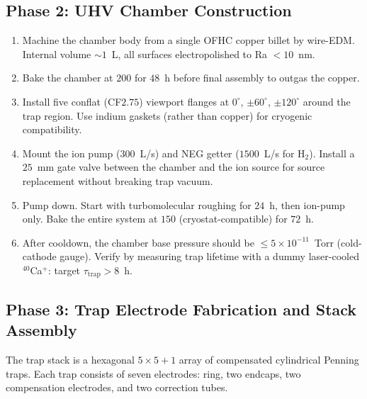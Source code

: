 \subsection{Phase 2: UHV Chamber Construction}
\label{subsec:phase2_uhv}

\begin{enumerate}[leftmargin=1.5em]
    \item Machine the chamber body from a single OFHC copper billet by wire-EDM. Internal volume $\sim 1$~L, all surfaces electropolished to Ra $< 10$~nm.
    \item Bake the chamber at $200$\textcelsius{} for $48$~h before final assembly to outgas the copper.
    \item Install five conflat (CF$2.75$) viewport flanges at $0^\circ$, $\pm 60^\circ$, $\pm 120^\circ$ around the trap region. Use indium gaskets (rather than copper) for cryogenic compatibility.
    \item Mount the ion pump ($300$~L/s) and NEG getter ($1500$~L/s for H$_2$). Install a $25$~mm gate valve between the chamber and the ion source for source replacement without breaking trap vacuum.
    \item Pump down. Start with turbomolecular roughing for $24$~h, then ion-pump only. Bake the entire system at $150$\textcelsius{} (cryostat-compatible) for $72$~h.
    \item After cooldown, the chamber base pressure should be $\le 5\times10^{-11}$~Torr (cold-cathode gauge). Verify by measuring trap lifetime with a dummy laser-cooled $^{40}$Ca$^+$: target $\tau_{\mathrm{trap}} > 8$~h.
\end{enumerate}

\subsection{Phase 3: Trap Electrode Fabrication and Stack Assembly}
\label{subsec:phase3_electrodes}

The trap stack is a hexagonal $5\times5 + 1$ array of compensated cylindrical Penning traps. Each trap consists of seven electrodes: ring, two endcaps, two compensation electrodes, and two correction tubes.

